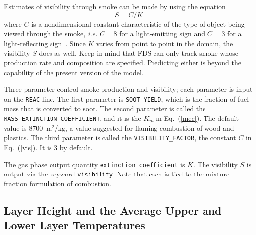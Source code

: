 \documentclass[11pt]{book}
\newcommand{\ct}{\tt\small}
\newcommand{\be}{\begin{equation}}
\newcommand{\ee}{\end{equation}}
\begin{document}
Estimates of visibility through smoke can be made by using the
equation
\be  S = C/K  \label{vis}  \ee
where $C$ is a nondimensional constant characteristic of
the type of object being viewed through the smoke, {\em i.e.}
$C=8$ for a light-emitting sign and $C=3$ for a light-reflecting
sign~\cite{SFPE:Mulholland}. Since $K$ varies from point to point in the
domain, the visibility $S$ does as well. Keep in mind that
FDS can only track smoke whose production rate and composition
are specified. Predicting either is beyond the
capability of the present version of the model.

Three parameter control smoke production and visibility; each
parameter is input on the {\ct REAC} line. The first parameter
is {\ct SOOT\_YIELD}, which is the fraction of fuel mass that
is converted to soot. The second parameter is called the
{\ct MASS\_EXTINCTION\_COEFFICIENT}, and it is the $K_m$ in
Eq.~(\ref{mec}). The default value is 8700~m$^2$/kg, a value
suggested for flaming combustion of wood and plastics.
The third parameter is called the {\ct VISIBILITY\_FACTOR}, the
constant $C$ in Eq.~(\ref{vis}). It is 3 by default.

The gas phase output quantity {\ct extinction coefficient} is $K$.
The visibility $S$ is output via the keyword {\ct visibility}. Note
that each is tied to the mixture fraction formulation of combustion.


\subsection{Layer Height and the Average Upper and Lower Layer Temperatures}
\label{info:layerheight}
\end{document}
